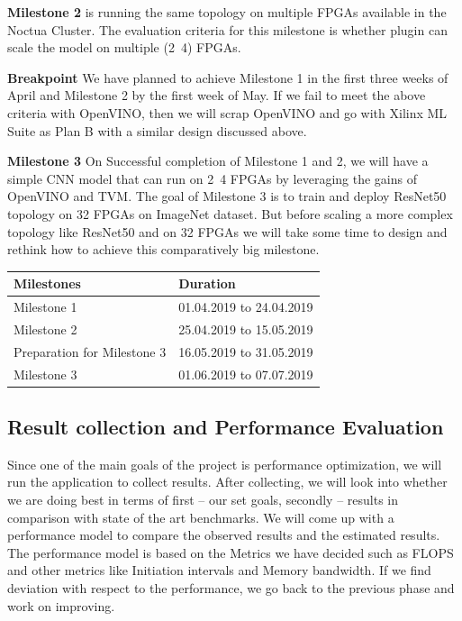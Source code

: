 \documentclass[titlepage]{report}
\begin{document}
\textbf{Milestone 2} is running the same topology on multiple FPGAs available in the Noctua Cluster. The evaluation criteria for this milestone is whether plugin can scale the model on multiple (2~4) FPGAs.

\textbf{Breakpoint} We have planned to achieve Milestone 1 in the first three weeks of April and Milestone 2 by the first week of May. If we fail to meet the above criteria with OpenVINO, then we will scrap OpenVINO and go with Xilinx ML Suite as Plan B with a similar design discussed above.

\textbf{Milestone 3} On Successful completion of Milestone 1 and 2, we will have a simple CNN model that can run on 2~4 FPGAs by leveraging the gains of OpenVINO and TVM. The goal of Milestone 3 is to train and deploy ResNet50 topology on 32 FPGAs on ImageNet dataset. But before scaling a more complex topology like ResNet50 and on 32 FPGAs we will take some time to design and rethink how to achieve this comparatively big milestone.

\begin{table}[]
\begin{tabular}{|l|l|}
\hline
Milestones                  & Duration                 \\ \hline
Milestone 1                 & 01.04.2019 to 24.04.2019 \\ \hline
Milestone 2                 & 25.04.2019 to 15.05.2019 \\ \hline
Preparation for Milestone 3 & 16.05.2019 to 31.05.2019 \\ \hline
Milestone 3                 & 01.06.2019 to 07.07.2019 \\ \hline
\end{tabular}
\end{table}

\subsection{Result collection and Performance Evaluation}
Since one of the main goals of the project is performance optimization, we will run the application to collect results. After collecting, we will look into whether we are doing best in terms of first – our set goals, secondly – results in comparison with state of the art benchmarks. We will come up with a performance model to compare the observed results and the estimated results. The performance model is based on the Metrics we have decided such as FLOPS and other metrics like Initiation intervals and Memory bandwidth. If we find deviation with respect to the performance, we go back to the previous phase and work on improving.
\end{document}
